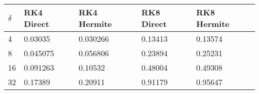 \begin{tabular}{lllll}
\hline
$\delta$ & RK4 Direct & RK4 Hermite & RK8 Direct & RK8 Hermite \\ 
\hline 
4 & 0.03035 & 0.030266 & 0.13413 & 0.13574 \\ 
8 & 0.045075 & 0.056806 & 0.23894 & 0.25231 \\ 
16 & 0.091263 & 0.10532 & 0.48004 & 0.49308 \\ 
32 & 0.17389 & 0.20911 & 0.91179 & 0.95647 \\ 
\hline 
\end{tabular}